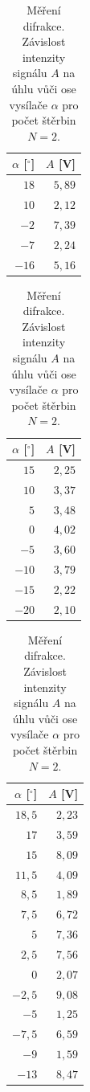 \documentclass[english]{article}
\begin{document}
	\begin{table}
	\parbox{.33\linewidth}{
	\centering
	\begin{tabular}{|r|r|}
	\hline
	$\alpha$ [$^\circ$]   &   $A$ [V] \\\hline \hline
	$18$   &   $5,89$ \\\hline
	$10$   &   $2,12$ \\\hline
	$-2$   &   $7,39$ \\\hline
	$-7$   &   $2,24$ \\\hline
	$-16$   &   $5,16$ \\\hline
	
	\end{tabular}
	
	\caption{Měření difrakce. Závislost intenzity signálu $A$ na úhlu vůči ose vysílače $\alpha$ pro počet štěrbin $N=1$.}
	\label{tab:difrakce_n1}
	}
	\parbox{.33\linewidth}{
	\centering
	\begin{tabular}{|r|r|}
	\hline
	$\alpha$ [$^\circ$]   &   $A$ [V] \\\hline \hline
	$15$   &   $2,25$ \\\hline
	$10$   &   $3,37$ \\\hline
	$5$   &   $3,48$ \\\hline
	$0$   &   $4,02$ \\\hline
	$-5$   &   $3,60$ \\\hline
	$-10$   &   $3,79$ \\\hline
	$-15$   &   $2,22$ \\\hline
	$-20$   &   $2,10$ \\\hline
	
	\end{tabular}
		
	\caption{Měření difrakce. Závislost intenzity signálu $A$ na úhlu vůči ose vysílače $\alpha$ pro počet štěrbin $N=2$.}
	\label{tab:difrakce_n2}
	}
	\hfill
	\parbox{.33\linewidth}{
	\centering
	\begin{tabular}{|r|r|}
	\hline
	$\alpha$ [$^\circ$]   &   $A$ [V] \\\hline \hline
	$18,5$   &   $2,23$ \\\hline
	$17$   &   $3,59$ \\\hline
	$15$   &   $8,09$ \\\hline
	$11,5$   &   $4,09$ \\\hline
	$8,5$   &   $1,89$ \\\hline
	$7,5$   &   $6,72$ \\\hline
	$5$   &   $7,36$ \\\hline
	$2,5$   &   $7,56$ \\\hline
	$0$   &   $2,07$ \\\hline
	$-2,5$   &   $9,08$ \\\hline
	$-5$   &   $1,25$ \\\hline
	$-7,5$   &   $6,59$ \\\hline
	$-9$   &   $1,59$ \\\hline
	$-13$   &   $8,47$ \\\hline
	

\end{tabular}}
\end{table}
\end{document}
